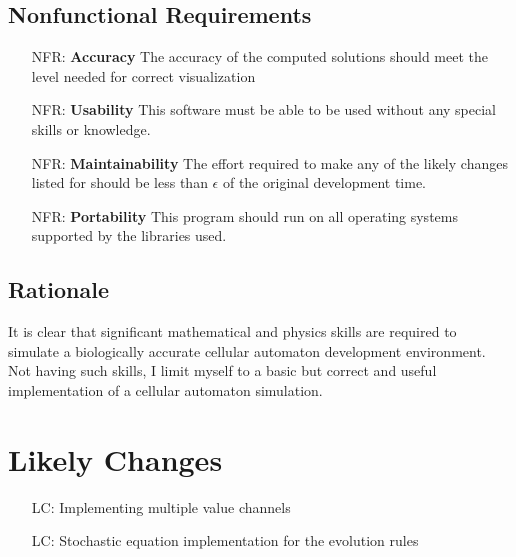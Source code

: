 \documentclass[12pt]{article}
\newcounter{nfrnum} %
\newcounter{lcnum} %
\begin{document}
\subsection{Nonfunctional Requirements}

\noindent \begin{itemize}

\item[NFR\refstepcounter{nfrnum}\thenfrnum \label{NFR_Accuracy}:]
  \textbf{Accuracy} The accuracy of the computed solutions should meet the level needed for correct visualization

\item[NFR\refstepcounter{nfrnum}\thenfrnum \label{NFR_Usability}:] \textbf{Usability} This software must be able to be used without any special skills or knowledge.

\item[NFR\refstepcounter{nfrnum}\thenfrnum \label{NFR_Maintainability}:]
  \textbf{Maintainability} The effort required to make any of the likely
    changes listed for \progname{} should be less than $\epsilon$ of the original
    development time.

\item[NFR\refstepcounter{nfrnum}\thenfrnum \label{NFR_Portability}:]
  \textbf{Portability} This program should run on all operating systems supported by the libraries used.

\end{itemize}

\subsection{Rationale}

It is clear that significant mathematical and physics skills are required to simulate a biologically accurate cellular automaton development environment. 
Not having such skills, I limit myself to a basic but correct and useful implementation of a cellular automaton simulation.

\section{Likely Changes}    

\noindent \begin{itemize}

\item[LC\refstepcounter{lcnum}\thelcnum\label{LC_meaningfulLabel}:] Implementing multiple value channels

\item[LC\refstepcounter{lcnum}\thelcnum\label{LC_meaningfulLabel}:] Stochastic equation implementation for the evolution rules
\end{itemize}
\end{document}
